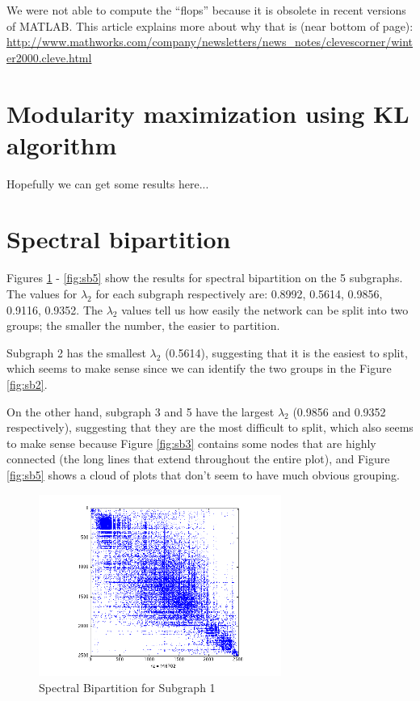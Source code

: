\documentclass[11pt]{article}
\begin{document}
We were not able to compute the ``flops'' because it is obsolete in recent versions of MATLAB. This article explains more about why that is (near bottom of page): \url{http://www.mathworks.com/company/newsletters/news_notes/clevescorner/winter2000.cleve.html}

\section{Modularity maximization using KL algorithm}
Hopefully we can get some results here...

\section{Spectral bipartition}
Figures \ref{fig:sb1} - \ref{fig:sb5} show the results for spectral bipartition on the 5 subgraphs. The values for $\lambda_2$ for each subgraph respectively are: 0.8992, 0.5614, 0.9856, 0.9116, 0.9352. The $\lambda_2$ values tell us how easily the network can be split into two groups; the smaller the number, the easier to partition.

Subgraph 2 has the smallest $\lambda_2$ (0.5614), suggesting that it is the easiest to split, which seems to make sense since we can identify the two groups in the Figure \ref{fig:sb2}.

On the other hand, subgraph 3 and 5 have the largest $\lambda_2$ (0.9856 and 0.9352 respectively), suggesting that they are the most difficult to split, which also seems to make sense because Figure \ref{fig:sb3} contains some nodes that are highly connected (the long lines that extend throughout the entire plot), and Figure \ref{fig:sb5} shows a cloud of plots that don't seem to have much obvious grouping.

		 \begin{figure}
		 		\begin{center}
		  		\includegraphics[width=300px]{../graphs/spectral_partition_a1.png}
		  	\end{center}
		  	\caption{Spectral Bipartition for Subgraph 1}
		  	\label{fig:sb1}
		 \end{figure}
		 
\end{document}
